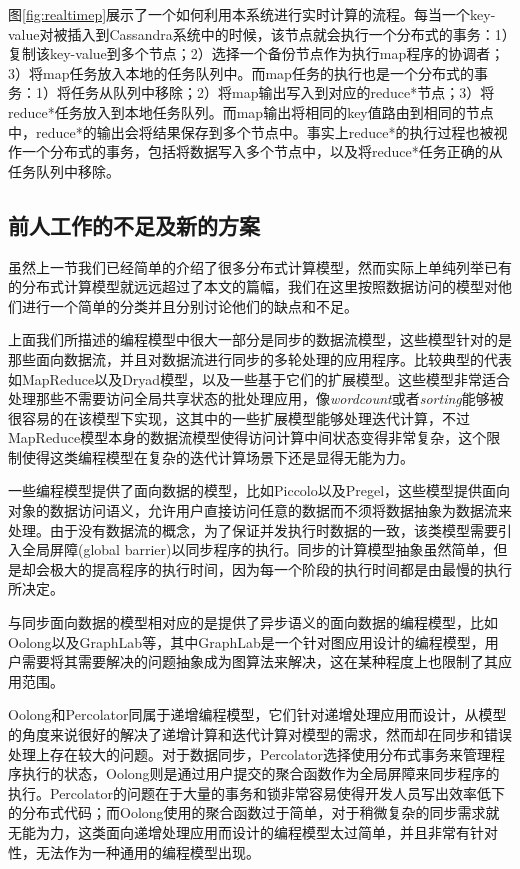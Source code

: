 图\ref{fig:realtimep}展示了一个如何利用本系统进行实时计算的流程。每当一个key-value对被插入到Cassandra系统中的时候，该节点就会执行一个分布式的事务：1）复制该key-value到多个节点；2）选择一个备份节点作为执行map程序的协调者；3）将map任务放入本地的任务队列中。而map任务的执行也是一个分布式的事务：1）将任务从队列中移除；2）将map输出写入到对应的reduce*节点；3）将reduce*任务放入到本地任务队列。而map输出将相同的key值路由到相同的节点中，reduce*的输出会将结果保存到多个节点中。事实上reduce*的执行过程也被视作一个分布式的事务，包括将数据写入多个节点中，以及将reduce*任务正确的从任务队列中移除。

\subsection{前人工作的不足及新的方案}

虽然上一节我们已经简单的介绍了很多分布式计算模型，然而实际上单纯列举已有的分布式计算模型就远远超过了本文的篇幅，我们在这里按照数据访问的模型对他们进行一个简单的分类并且分别讨论他们的缺点和不足。

上面我们所描述的编程模型中很大一部分是同步的数据流模型，这些模型针对的是那些面向数据流，并且对数据流进行同步的多轮处理的应用程序。比较典型的代表如MapReduce\cite{dean2008mapreduce}以及Dryad\cite{isard2007dryad}模型，以及一些基于它们的扩展模型\cite{bu2010haloop,ekanayake2010twister,zhang2011priter}。这些模型非常适合处理那些不需要访问全局共享状态的批处理应用，像\textit{wordcount}或者\textit{sorting}能够被很容易的在该模型下实现，这其中的一些扩展模型能够处理迭代计算，不过MapReduce模型本身的数据流模型使得访问计算中间状态变得非常复杂，这个限制使得这类编程模型在复杂的迭代计算场景下还是显得无能为力。

一些编程模型提供了面向数据的模型，比如Piccolo\cite{power2010piccolo}以及Pregel\cite{malewicz2010pregel}，这些模型提供面向对象的数据访问语义，允许用户直接访问任意的数据而不须将数据抽象为数据流来处理。由于没有数据流的概念，为了保证并发执行时数据的一致，该类模型需要引入全局屏障(global barrier)以同步程序的执行。同步的计算模型抽象虽然简单，但是却会极大的提高程序的执行时间，因为每一个阶段的执行时间都是由最慢的执行所决定。

与同步面向数据的模型相对应的是提供了异步语义的面向数据的编程模型，比如Oolong\cite{mitchell2012oolong}以及GraphLab\cite{Low:2012:DGF:2212351.2212354}等，其中GraphLab是一个针对图应用设计的编程模型，用户需要将其需要解决的问题抽象成为图算法来解决，这在某种程度上也限制了其应用范围。

Oolong和Percolator同属于递增编程模型，它们针对递增处理应用而设计，从模型的角度来说很好的解决了递增计算和迭代计算对模型的需求，然而却在同步和错误处理上存在较大的问题。对于数据同步，Percolator选择使用分布式事务来管理程序执行的状态，Oolong则是通过用户提交的聚合函数作为全局屏障来同步程序的执行。Percolator的问题在于大量的事务和锁非常容易使得开发人员写出效率低下的分布式代码；而Oolong使用的聚合函数过于简单，对于稍微复杂的同步需求就无能为力，这类面向递增处理应用而设计的编程模型太过简单，并且非常有针对性，无法作为一种通用的编程模型出现。

